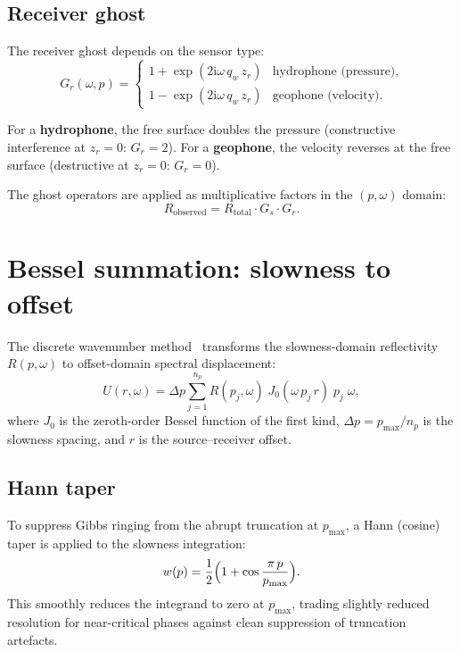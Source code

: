 \documentclass[11pt,a4paper]{article}
\newcommand{\D}{\Delta}
\newcommand{\ii}{\mathrm{i}}
\begin{document}
\subsection{Receiver ghost}

The receiver ghost depends on the sensor type:
\begin{equation}\label{eq:receiver_ghost}
  G_r(\omega, p) = \begin{cases}
    1 + \exp(2\ii\omega\,q_w\,z_r) & \text{hydrophone (pressure)}, \\
    1 - \exp(2\ii\omega\,q_w\,z_r) & \text{geophone (velocity)}.
  \end{cases}
\end{equation}

For a \textbf{hydrophone}, the free surface doubles the pressure
(constructive interference at $z_r = 0$: $G_r = 2$).
For a \textbf{geophone}, the velocity reverses at the free surface
(destructive at $z_r = 0$: $G_r = 0$).

The ghost operators are applied as multiplicative factors in
the $(p, \omega)$ domain:
\begin{equation}
  R_{\text{observed}} = R_{\text{total}} \cdot G_s \cdot G_r.
\end{equation}

\section{Bessel summation: slowness to offset}
\label{sec:bessel}

The discrete wavenumber method~\cite{bouchon1981} transforms the
slowness-domain reflectivity $R(p, \omega)$ to offset-domain
spectral displacement:
\begin{equation}\label{eq:bessel}
  U(r, \omega)
  = \D p \sum_{j=1}^{n_p}
    R(p_j, \omega)\;J_0(\omega\,p_j\,r)\;p_j\;\omega,
\end{equation}
where $J_0$ is the zeroth-order Bessel function of the first kind,
$\D p = p_{\max} / n_p$ is the slowness spacing, and $r$ is the
source--receiver offset.

\subsection{Hann taper}

To suppress Gibbs ringing from the abrupt truncation at
$p_{\max}$, a Hann (cosine) taper is applied to the slowness
integration:
\begin{equation}
  w(p) = \frac{1}{2}\Bigl(1 + \cos\frac{\pi\,p}{p_{\max}}\Bigr).
\end{equation}
This smoothly reduces the integrand to zero at $p_{\max}$, trading
slightly reduced resolution for near-critical phases against
clean suppression of truncation artefacts.
\end{document}
